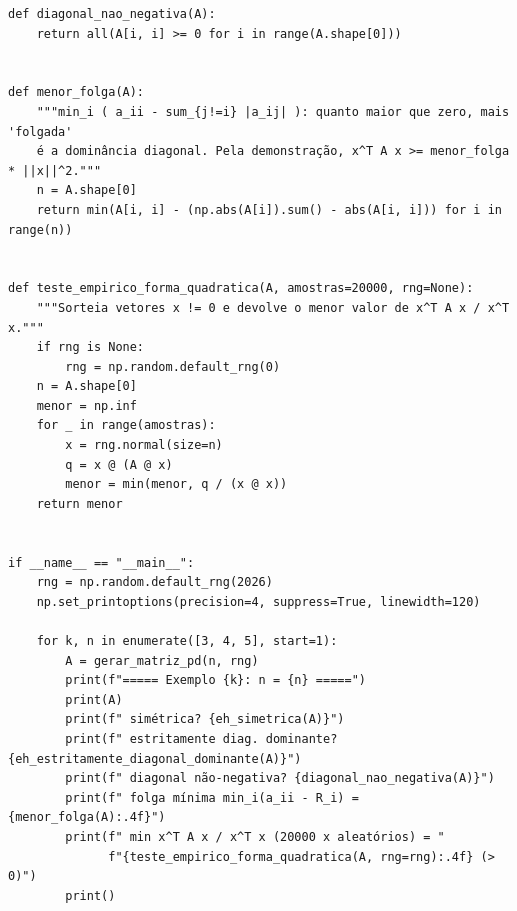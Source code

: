 \documentclass{article}
\theoremstyle{remark}
\begin{document}
\begin{lstlisting}
def diagonal_nao_negativa(A):
    return all(A[i, i] >= 0 for i in range(A.shape[0]))


def menor_folga(A):
    """min_i ( a_ii - sum_{j!=i} |a_ij| ): quanto maior que zero, mais 'folgada'
    é a dominância diagonal. Pela demonstração, x^T A x >= menor_folga * ||x||^2."""
    n = A.shape[0]
    return min(A[i, i] - (np.abs(A[i]).sum() - abs(A[i, i])) for i in range(n))


def teste_empirico_forma_quadratica(A, amostras=20000, rng=None):
    """Sorteia vetores x != 0 e devolve o menor valor de x^T A x / x^T x."""
    if rng is None:
        rng = np.random.default_rng(0)
    n = A.shape[0]
    menor = np.inf
    for _ in range(amostras):
        x = rng.normal(size=n)
        q = x @ (A @ x)
        menor = min(menor, q / (x @ x))
    return menor


if __name__ == "__main__":
    rng = np.random.default_rng(2026)
    np.set_printoptions(precision=4, suppress=True, linewidth=120)

    for k, n in enumerate([3, 4, 5], start=1):
        A = gerar_matriz_pd(n, rng)
        print(f"===== Exemplo {k}: n = {n} =====")
        print(A)
        print(f" simétrica? {eh_simetrica(A)}")
        print(f" estritamente diag. dominante? {eh_estritamente_diagonal_dominante(A)}")
        print(f" diagonal não-negativa? {diagonal_nao_negativa(A)}")
        print(f" folga mínima min_i(a_ii - R_i) = {menor_folga(A):.4f}")
        print(f" min x^T A x / x^T x (20000 x aleatórios) = "
              f"{teste_empirico_forma_quadratica(A, rng=rng):.4f} (> 0)")
        print()
\end{lstlisting}
\end{document}
